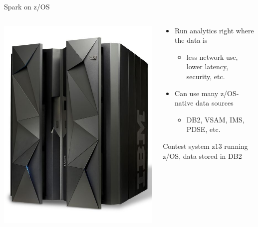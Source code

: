 \documentclass[xcolor=dvipsnames]{beamer}
\begin{document}
\begin{frame}[t]{Spark on z/OS}
	\begin{columns}
		\begin{column}[T]{0.45\textwidth}
			\includegraphics[width=\linewidth]{z13}
		\end{column}
		\begin{column}[T]{0.6\textwidth}
			\addtolength{\leftmargini}{-10pt}
			\begin{itemize}
				\item Run analytics right where the data is
					\begin{itemize}
						\item less network use, lower latency, security, etc.
					\end{itemize}
				\pause
				\item Can use many z/OS-native data sources
					\begin{itemize}
						\item DB2, VSAM, IMS, PDSE, etc.
					\end{itemize}
			\end{itemize}
			
			\pause
			\begin{block}{Contest system}
				z13 running z/OS, data stored in DB2
			\end{block}
		\end{column}
	\end{columns}
\end{frame}
\end{document}
